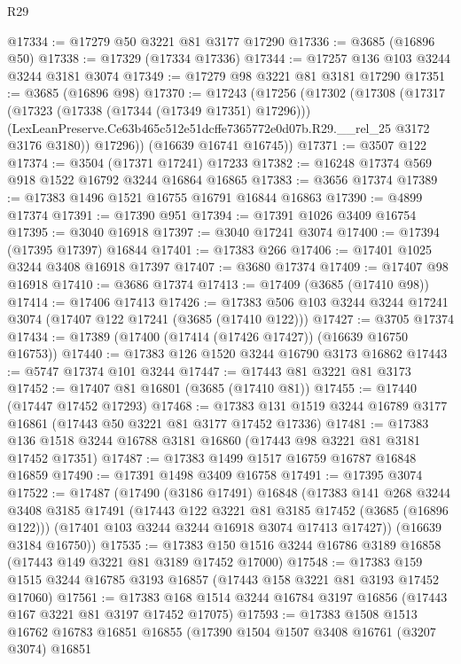 \begin{lexlean}{R29}
\begin{coremodule}
@17334 := @17279 @50 @3221 @81 @3177 @17290
@17336 := @3685 (@16896 @50)
@17338 := @17329 (@17334 @17336)
@17344 := @17257 @136 @103 @3244 @3244 @3181 @3074
@17349 := @17279 @98 @3221 @81 @3181 @17290
@17351 := @3685 (@16896 @98)
@17370 := @17243
    (@17256
      (@17302
        (@17308
          (@17317
            (@17323 (@17338 (@17344 (@17349 @17351) @17296)))
            (LexLeanPreserve.Ce63b465c512e51dcffe7365772e0d07b.R29.__rel_25 @3172 @3176 @3180))
          @17296))
      (@16639 @16741 @16745))
@17371 := @3507 @122
@17374 := @3504 (@17371 @17241) @17233
@17382 := @16248 @17374 @569 @918 @1522 @16792 @3244 @16864 @16865
@17383 := @3656 @17374
@17389 := @17383 @1496 @1521 @16755 @16791 @16844 @16863
@17390 := @4899 @17374
@17391 := @17390 @951
@17394 := @17391 @1026 @3409 @16754
@17395 := @3040 @16918
@17397 := @3040 @17241 @3074
@17400 := @17394 (@17395 @17397) @16844
@17401 := @17383 @266
@17406 := @17401 @1025 @3244 @3408 @16918 @17397
@17407 := @3680 @17374
@17409 := @17407 @98 @16918
@17410 := @3686 @17374
@17413 := @17409 (@3685 (@17410 @98))
@17414 := @17406 @17413
@17426 := @17383 @506 @103 @3244 @3244 @17241 @3074 (@17407 @122 @17241 (@3685 (@17410 @122)))
@17427 := @3705 @17374
@17434 := @17389 (@17400 (@17414 (@17426 @17427)) (@16639 @16750 @16753))
@17440 := @17383 @126 @1520 @3244 @16790 @3173 @16862
@17443 := @5747 @17374 @101 @3244
@17447 := @17443 @81 @3221 @81 @3173
@17452 := @17407 @81 @16801 (@3685 (@17410 @81))
@17455 := @17440 (@17447 @17452 @17293)
@17468 := @17383 @131 @1519 @3244 @16789 @3177 @16861 (@17443 @50 @3221 @81 @3177 @17452 @17336)
@17481 := @17383 @136 @1518 @3244 @16788 @3181 @16860 (@17443 @98 @3221 @81 @3181 @17452 @17351)
@17487 := @17383 @1499 @1517 @16759 @16787 @16848 @16859
@17490 := @17391 @1498 @3409 @16758
@17491 := @17395 @3074
@17522 := @17487
    (@17490
      (@3186 @17491)
      @16848
      (@17383
        @141
        @268
        @3244
        @3408
        @3185
        @17491
        (@17443 @122 @3221 @81 @3185 @17452 (@3685 (@16896 @122)))
        (@17401 @103 @3244 @3244 @16918 @3074 @17413 @17427))
      (@16639 @3184 @16750))
@17535 := @17383 @150 @1516 @3244 @16786 @3189 @16858 (@17443 @149 @3221 @81 @3189 @17452 @17000)
@17548 := @17383 @159 @1515 @3244 @16785 @3193 @16857 (@17443 @158 @3221 @81 @3193 @17452 @17060)
@17561 := @17383 @168 @1514 @3244 @16784 @3197 @16856 (@17443 @167 @3221 @81 @3197 @17452 @17075)
@17593 := @17383
    @1508
    @1513
    @16762
    @16783
    @16851
    @16855
    (@17390
      @1504
      @1507
      @3408
      @16761
      (@3207 @3074)
      @16851

\end{coremodule}
\end{lexlean}
